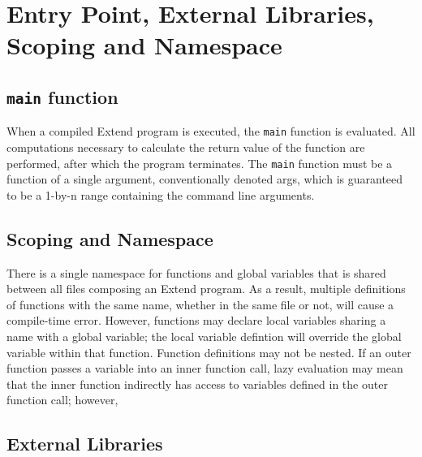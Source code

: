 \section{Entry Point, External Libraries, Scoping and Namespace}
\subsection{\texttt{main} function}
When a compiled Extend program is executed, the \texttt{main} function is evaluated. All computations necessary to calculate the return value of the function are performed, after which the program terminates. The \texttt{main} function must be a function of a single argument, conventionally denoted args, which is guaranteed to be a 1-by-n range containing the command line arguments.
\subsection{Scoping and Namespace}
There is a single namespace for functions and global variables that is shared between all files composing an Extend program. As a result, multiple definitions of functions with the same name, whether in the same file or not, will cause a compile-time error. However, functions may declare local variables sharing a name with a global variable; the local variable defintion will override the global variable within that function. Function definitions may not be nested. If an outer function passes a variable into an inner function call, lazy evaluation may mean that the inner function indirectly has access to variables defined in the outer function call; however, 

\subsection{External Libraries}

\label{sec:ExternFunctionSignatures}
